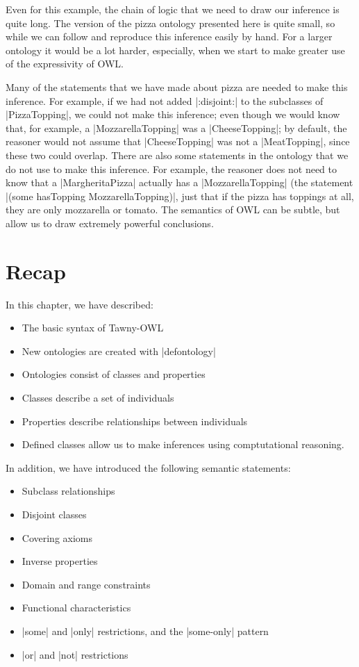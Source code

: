 Even for this example, the chain of logic that we need to draw our
inference is quite long. The version of the pizza ontology presented
here is quite small, so while we can follow and reproduce this
inference easily by hand. For a larger ontology it would be a lot
harder, especially, when we start to make greater use of the
expressivity of OWL.

Many of the statements that we have made about pizza are needed to make this
inference. For example, if we had not added |:disjoint:| to the subclasses of
|PizzaTopping|, we could not make this inference; even though we would know
that, for example, a |MozzarellaTopping| was a |CheeseTopping|; by default,
the reasoner would not assume that |CheeseTopping| was not a |MeatTopping|,
since these two could overlap. There are also some statements in the ontology
that we do not use to make this inference. For example, the reasoner does not
need to know that a |MargheritaPizza| actually has a |MozzarellaTopping| (the
statement |(some hasTopping MozzarellaTopping)|, just that if the pizza has
toppings at all, they are only mozzarella or tomato. The semantics of OWL can
be subtle, but allow us to draw extremely powerful conclusions.

\section{Recap}
\label{sec:recap-pizza}

In this chapter, we have described:

\begin{itemize}
\item The basic syntax of Tawny-OWL
\item New ontologies are created with |defontology|
\item Ontologies consist of classes and properties
\item Classes describe a set of individuals
\item Properties describe relationships between individuals
\item Defined classes allow us to make inferences using comptutational
  reasoning.
\end{itemize}

In addition, we have introduced the following semantic statements:
\begin{itemize}
\item Subclass relationships
\item Disjoint classes
\item Covering axioms
\item Inverse properties
\item Domain and range constraints
\item Functional characteristics
\item |some| and |only| restrictions, and the |some-only| pattern
\item |or| and |not| restrictions
\end{itemize}

